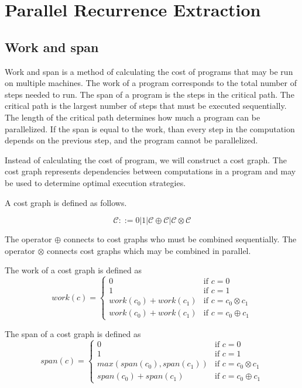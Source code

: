 \chapter{Parallel Recurrence Extraction}

\section{Work and span}
Work and span is a method of calculating the cost of programs that may be run on multiple machines.
The work of a program corresponds to the total number of steps needed to run.
The span of a program is the steps in the critical path.
The critical path is the largest number of steps that must be executed sequentially.
The length of the critical path determines how much a program can be parallelized.
If the span is equal to the work, than every step in the computation depends on the previous step, and the program cannot be parallelized.

Instead of calculating the cost of program, we will construct a cost graph.
The cost graph represents dependencies between computations in a program and may be used to determine optimal execution strategies.

A cost graph is defined as follows.

\[ \mathcal{C} ::= 0 | 1 | \mathcal{C} \oplus \mathcal{C} | \mathcal{C} \otimes \mathcal{C} \]

The operator $\oplus$ connects to cost graphs who must be combined sequentially.
The operator $\otimes$ connects cost graphs which may be combined in parallel.

The work of a cost graph is defined as 
\begin{equation*}
  work(c) = \begin{cases}
    0 &\text{if } c = 0 \\
    1 &\text{if } c = 1 \\
    work(c_0) + work(c_1) &\text{if } c = c_0 \otimes c_1 \\
    work(c_0) + work(c_1) &\text{if } c = c_0 \oplus c_1
  \end{cases}
\end{equation*}

The span of a cost graph is defined as
\begin{equation*}
  span(c) = \begin{cases}
    0 &\text{if } c = 0 \\
    1 &\text{if } c = 1 \\
    max(span(c_0), span(c_1)) &\text{if } c = c_0 \otimes c_1 \\
    span(c_0) + span(c_1) &\text{if } c = c_0 \oplus c_1
  \end{cases}
\end{equation*}


